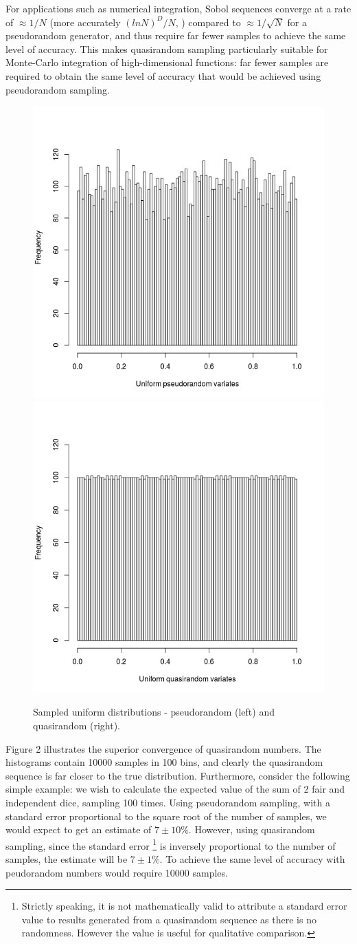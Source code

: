 \documentclass{JASSS}
\begin{document}
For applications such as numerical integration, Sobol sequences converge
at a rate of \(\approx1/N\) (more accurately \((ln N)^D/N\), \cite{press_numerical_nodate})
compared to \(\approx1/\sqrt N\) for a pseudorandom generator, and thus
require far fewer samples to achieve the same level of accuracy. This makes quasirandom sampling particularly suitable for Monte-Carlo integration of high-dimensional functions: far fewer samples are required to obtain the same level of accuracy that would be achieved using pseudorandom sampling. 

\begin{figure}[!t]
\includegraphics[width=0.5\linewidth]{figures/hist_pseudo} 
\includegraphics[width=0.5\linewidth]{figures/hist_quasi} 
\caption{Sampled uniform distributions -  pseudorandom (left) and quasirandom (right).}
\label{fig:hist_pq_1d}
\end{figure}

Figure 2 illustrates the superior convergence of quasirandom numbers. The histograms contain 10000 samples in 100 bins, and clearly the quasirandom sequence is far closer to the true distribution. Furthermore, consider the following simple example: we wish to calculate the expected value of the sum of 2 fair and independent dice, sampling 100 times. Using pseudorandom sampling, with a standard error proportional to the square root of the number of samples, we would expect to get an estimate of \(7 \pm 10\%\). However, using quasirandom sampling, since the standard error
\footnote{Strictly speaking, it is not mathematically valid to attribute a standard error value to results generated from a quasirandom sequence as there is no randomness. However the value is useful for qualitative comparison.} 
  is inversely proportional to the number of samples, the estimate will be \(7 \pm 1\%\). To achieve the same level of accuracy with peudorandom numbers would require 10000 samples.
\end{document}
